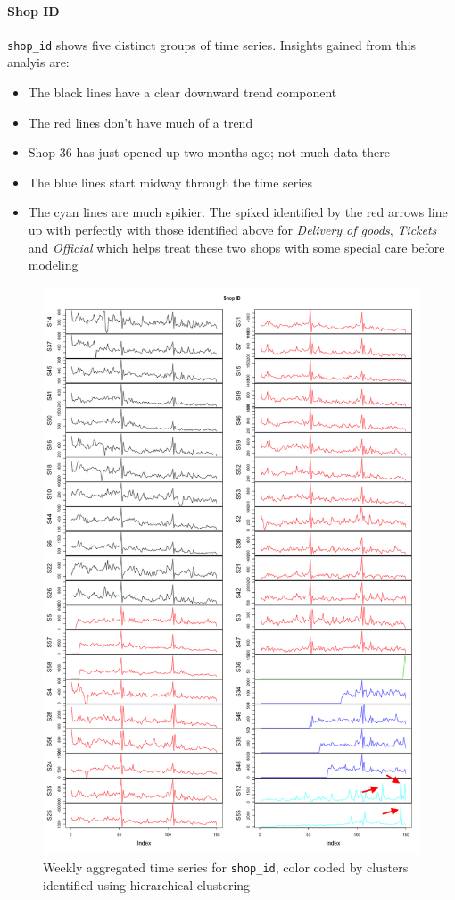 \documentclass[floatsintext,man]{apa6}
\providecommand{\tightlist}{%
  \setlength{\itemsep}{0pt}\setlength{\parskip}{0pt}}
\theoremstyle{definition}
\theoremstyle{definition}
\theoremstyle{definition}
\theoremstyle{remark}
\begin{document}
\paragraph{Shop ID}\label{shop-id}

\texttt{shop\_id} shows five distinct groups of time series. Insights
gained from this analyis are:

\begin{itemize}
\tightlist
\item
  The black lines have a clear downward trend component
\item
  The red lines don't have much of a trend
\item
  Shop 36 has just opened up two months ago; not much data there
\item
  The blue lines start midway through the time series
\item
  The cyan lines are much spikier. The spiked identified by the red
  arrows line up with perfectly with those identified above for
  \emph{Delivery of goods}, \emph{Tickets} and \emph{Official} which
  helps treat these two shops with some special care before modeling
\end{itemize}

\begin{figure}
\centering
\includegraphics{../graphs/zoo_clust_shopid.png}
\caption{Weekly aggregated time series for \texttt{shop\_id}, color
coded by clusters identified using hierarchical clustering}
\end{figure}
\end{document}
